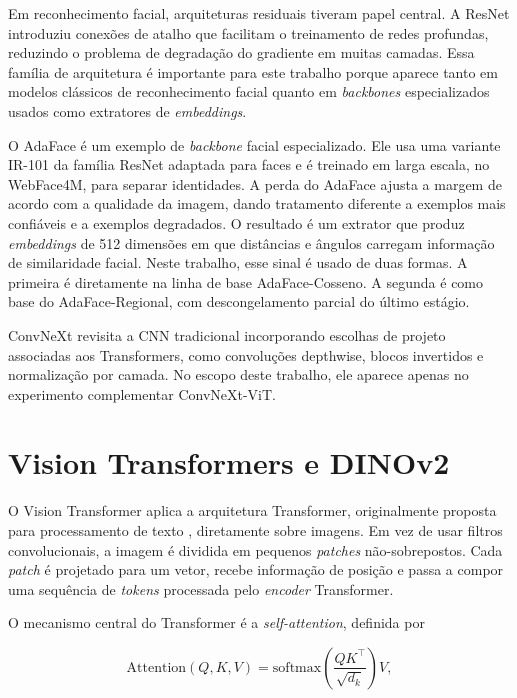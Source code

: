 Em reconhecimento facial, arquiteturas residuais tiveram papel central. A ResNet \cite{he2016deep}
introduziu conexões de atalho que facilitam o treinamento de redes profundas, reduzindo o problema de degradação do gradiente em muitas camadas. Essa família de arquitetura é importante para este trabalho porque aparece tanto em modelos clássicos de reconhecimento facial quanto em \textit{backbones} especializados usados como extratores de \textit{embeddings}.

O AdaFace \cite{kim2022adaface} é um exemplo de \textit{backbone} facial especializado. Ele usa uma variante IR-101 da família ResNet adaptada para faces e é treinado em larga escala, no WebFace4M, para separar identidades. A perda do AdaFace ajusta a margem de acordo com a qualidade da imagem, dando tratamento diferente a exemplos mais confiáveis e a exemplos degradados. O resultado é um extrator que produz \textit{embeddings} de 512 dimensões em que distâncias e ângulos carregam informação de similaridade facial. Neste trabalho, esse sinal é usado de duas formas. A primeira é diretamente na linha de base AdaFace-Cosseno. A segunda é como base do AdaFace-Regional, com descongelamento parcial do último estágio.

ConvNeXt \cite{liu2022convnet} revisita a CNN tradicional incorporando escolhas de projeto associadas aos Transformers, como convoluções depthwise, blocos invertidos e normalização por camada. No escopo deste trabalho, ele aparece apenas no experimento complementar ConvNeXt-ViT.

\section{Vision Transformers e DINOv2}

O Vision Transformer \cite{dosovitskiy2020image} aplica a arquitetura Transformer, originalmente proposta para processamento de texto \cite{vaswani2017attention},
diretamente sobre imagens. Em vez de usar filtros convolucionais, a imagem é dividida em pequenos \textit{patches} não-sobrepostos. Cada \textit{patch} é projetado para um vetor, recebe informação de posição e passa a compor uma sequência de \textit{tokens} processada pelo \textit{encoder} Transformer.

O mecanismo central do Transformer é a \textit{self-attention}, definida por

\begin{equation}
\text{Attention}(Q, K, V) = \mathrm{softmax}\!\left( \frac{QK^\top}{\sqrt{d_k}} \right) V,
\label{eq:attention}
\end{equation}

